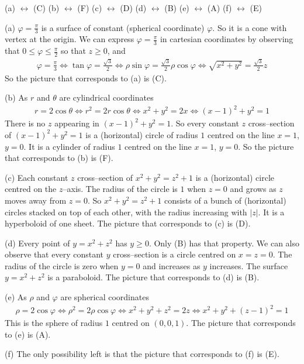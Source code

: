 \begin{answer}
(a) $\leftrightarrow$ (C) \qquad
(b) $\leftrightarrow$ (F) \qquad
(c) $\leftrightarrow$ (D) \qquad
(d) $\leftrightarrow$ (B) \qquad
(e) $\leftrightarrow$ (A) \qquad
(f) $\leftrightarrow$ (E)
\end{answer}

\begin{solution}
(a) $\varphi =\frac{\pi}{3}$ is a surface of constant (spherical coordinate)
$\varphi$. So it is a cone with vertex at the origin. We can express
$\varphi=\frac{\pi}{3}$ in cartesian coordinates by observing that
$0\le\varphi\le\frac{\pi}{2}$ so that $z\ge 0$, and
\begin{align*}
\varphi=\frac{\pi}{3}
\iff
\tan\varphi =\frac{\sqrt{3}}{2}
\iff
\rho\sin\varphi =\frac{\sqrt{3}}{2}\rho\cos\varphi
\iff
\sqrt{x^2+y^2}=\frac{\sqrt{3}}{2} z
\end{align*}
So the picture that corresponds to (a) is (C).

(b) As $r$ and $\theta$ are cylindrical coordinates
\begin{align*}
r=2\cos\theta
\iff
r^2=2 r\cos\theta
\iff
x^2+y^2 = 2x
\iff
(x-1)^2+y^2=1
\end{align*}
There is no $z$ appearing in $(x-1)^2+y^2=1$. So every constant $z$
cross--section of $(x-1)^2+y^2=1$ is a (horizontal) circle of radius
$1$ centred on the line $x=1$, $y=0$. It is a cylinder of radius $1$
centred on the line $x=1$, $y=0$.
So the picture that corresponds to (b) is (F).

(c) Each constant $z$ cross--section of $x^2+y^2=z^2+1$ is a (horizontal)
circle centred on the $z$--axis. The radius of the circle is $1$
when $z=0$ and grows as $z$ moves away from $z=0$.  So
$x^2+y^2=z^2+1$ consists of a bunch of (horizontal) circles stacked
on top of each other, with the radius increasing with $|z|$. It
is a hyperboloid of one sheet. 
The picture that corresponds to (c) is (D).

(d) Every point of $y=x^2+z^2$ has $y\ge 0$. Only (B) has that 
property. We can also observe that every constant $y$ cross--section
is a circle centred on $x=z=0$. The radius of the circle is zero
when $y=0$ and increases as $y$ increases. The surface $y=x^2+z^2$
is a paraboloid.
The picture that corresponds to (d) is (B).

(e) As $\rho$ and $\varphi$ are spherical coordinates
\begin{align*}
\rho=2\cos\varphi
\iff
\rho^2=2\rho\cos\varphi
\iff
x^2+y^2+z^2=2z
\iff
x^2+y^2 + (z-1)^2=1
\end{align*}
This is the sphere of radius $1$ centred on $(0,0,1)$.
The picture that corresponds to (e) is (A).

(f) The only possibility left is that the picture that
corresponds to (f) is (E).
\end{solution}

